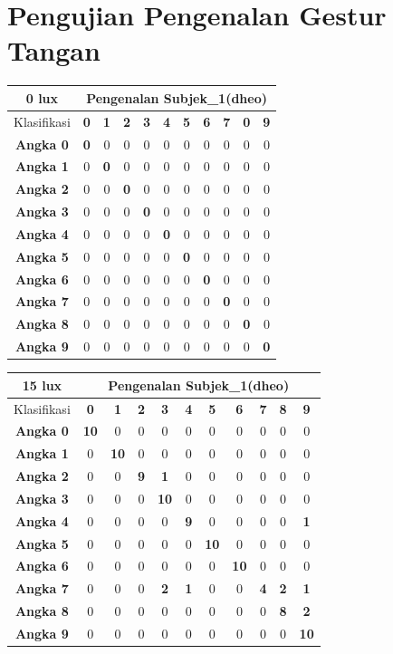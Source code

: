 \section{Pengujian Pengenalan Gestur Tangan}
\begin{tabular}{|c|c|c|c|c|c|c|c|c|c|c|}
	\hline 0 lux
	& \multicolumn{10}{|c|}{Pengenalan Subjek\_1(dheo)} \\
	\hline  Klasifikasi&\textbf{0} &\textbf{1} &\textbf{2} &\textbf{3} &\textbf{4}&\textbf{5} &\textbf{6}&\textbf{7}&\textbf{0}&\textbf{9}\\
	\hline \textbf{Angka 0} &\textbf{0} &0 &0 &0 &0 &0 &0 &0 &0 &0\\
	\hline \textbf{Angka 1} &0 &\textbf{0} &0 &0 &0 &0 &0 &0 &0 &0\\
	\hline \textbf{Angka 2} &0 &0 &\textbf{0} &0 &0 &0 &0 &0 &0 &0\\
	\hline \textbf{Angka 3} &0 &0 &0 &\textbf{0} &0 &0 &0 &0 &0 &0\\
	\hline \textbf{Angka 4} &0 &0 &0 &0 &\textbf{0} &0 &0 &0 &0 &0\\
	\hline \textbf{Angka 5} &0 &0 &0 &0 &0 &\textbf{0} &0 &0 &0 &0\\
	\hline \textbf{Angka 6} &0 &0 &0 &0 &0 &0 &\textbf{0} &0 &0 &0\\
	\hline \textbf{Angka 7} &0 &0 &0 &0 &0 &0 &0 &\textbf{0} &0 &0\\
	\hline \textbf{Angka 8} &0 &0 &0 &0 &0 &0 &0 &0 &\textbf{0} &0 \\
	\hline \textbf{Angka 9} &0 &0 &0 &0 &0 &0 &0 &0 &0 &\textbf{0} \\
	\hline
\end{tabular}

\begin{tabular}{|c|c|c|c|c|c|c|c|c|c|c|}
	\hline 15 lux
	& \multicolumn{10}{|c|}{Pengenalan Subjek\_1(dheo)} \\
	\hline  Klasifikasi&\textbf{0} &\textbf{1} &\textbf{2} &\textbf{3} &\textbf{4}&\textbf{5} &\textbf{6}&\textbf{7}&\textbf{8}&\textbf{9}\\
	\hline \textbf{Angka 0} &\textbf{10} &0 &0 &0 &0 &0 &0 &0 &0 &0\\
	\hline \textbf{Angka 1} &0 &\textbf{10} &0 &0 &0 &0 &0 &0 &0 &0\\
	\hline \textbf{Angka 2} &0 &0 &\textbf{9} &\textbf{1} &0 &0 &0 &0 &0 &0\\
	\hline \textbf{Angka 3} &0 &0 &0 &\textbf{10} &0 &0 &0 &0 &0 &0\\
	\hline \textbf{Angka 4} &0 &0 &0 &0 &\textbf{9} &0 &0 &0 &0 &\textbf{1}\\
	\hline \textbf{Angka 5} &0 &0 &0 &0 &0 &\textbf{10} &0 &0 &0 &0\\
	\hline \textbf{Angka 6} &0 &0 &0 &0 &0 &0 &\textbf{10} &0 &0 &0\\
	\hline \textbf{Angka 7} &0 &0 &0 &\textbf{2} &\textbf{1} &0 &0 &\textbf{4} &\textbf{2} &\textbf{1}\\
	\hline \textbf{Angka 8} &0 &0 &0 &0 &0 &0 &0 &0 &\textbf{8} &\textbf{2} \\
	\hline \textbf{Angka 9} &0 &0 &0 &0 &0 &0 &0 &0 &0 &\textbf{10} \\
	\hline
\end{tabular}

